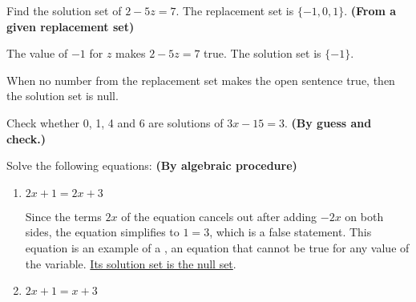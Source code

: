 \begin{example}
\Item Find the solution set of $2 - 5z = 7$. The replacement set is $\{-1, 0, 1\}$. \hfill \textbf{(From a given replacement set)}

\Solution


The value of $-1$ for $z$ makes $2 - 5z = 7$ true. The solution set is $\{-1\}$.

When no number from the replacement set makes the open sentence true, then the solution set is null.

\Item Check whether 0, 1, 4 and 6 are solutions of $3x-15 = 3.$ \hfill \textbf{(By guess and check.)}

\Solution

\Item Solve the following equations: \hfill \textbf{(By algebraic procedure)}
	\begin{enumerate}[1.]
	\item $2x+1=2x+3$
	
	Since the terms $2x$ of the equation cancels out after adding $-2x$ on both sides, the equation simplifies to $1 = 3$, which is a false statement. This equation is an example of a , an equation that cannot be true for any value of the variable. \underline{Its solution set is the null set}.

	\item $2x + 1 = x + 3$
	

\end{enumerate}
\end{example}
